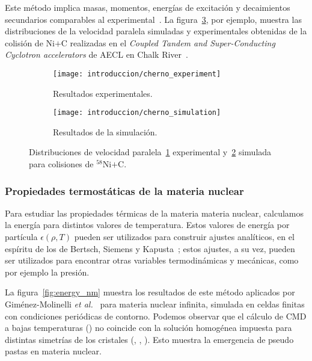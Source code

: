 Este método implica masas, momentos, energías de excitación y decaimientos secundarios comparables al experimental~\cite{belkacem_searching_1996,chernomoretz_quasiclassical_2002}.
La figura~\ref{fig:distribution}, por ejemplo, muestra las distribuciones de la velocidad paralela simuladas y experimentales obtenidas de la colisión de $\text{Ni+C}$ realizadas en el \emph{Coupled Tandem and Super-Conducting Cyclotron accelerators} de AECL en Chalk River~\cite{chernomoretz_quasiclassical_2002}.

\begin{figure}[h]
  \begin{subfigure}[h!]{0.48\columnwidth}
    \texttt{[image: introduccion/cherno\_experiment]}
    \caption{Resultados experimentales.}
    \label{sfig:exp}
  \end{subfigure}
  \begin{subfigure}[h!]{0.48\columnwidth}
    \texttt{[image: introduccion/cherno\_simulation]}
    \caption{Resultados de la simulación.}
    \label{sfig:sim}
  \end{subfigure}
  \centering
  \caption{Distribuciones de velocidad paralela~\ref{sfig:exp} experimental y~\ref{sfig:sim} simulada para colisiones de ${}^{58}\text{Ni+C}$.}
  \label{fig:distribution}
\end{figure}


\subsubsection{Propiedades termostáticas de la materia nuclear}
Para estudiar las propiedades térmicas de la materia materia nuclear, calculamos la energía para distintos valores de temperatura.
Estos valores de energía por partícula $\epsilon(\rho,T)$ pueden ser utilizados para construir ajustes analíticos, en el espíritu de los de Bertsch, Siemens y Kapusta~\cite{bertsch_nuclear_1983, kapusta_deuteron_1984,
  lopez_nuclear_1984}; estos ajustes, a su vez, pueden ser utilizados para encontrar otras variables termodinámicas y mecánicas, como por ejemplo la presión.

La figura~\ref{fig:energy_nm} muestra los resultados de este método aplicados por Giménez-Molinelli \emph{et al.}~\cite{gimenez_molinelli_simulations_2014} para materia nuclear infinita, simulada en celdas finitas con condiciones periódicas de contorno.
Podemos observar que el cálculo de CMD a bajas temperaturas () no coincide con la solución homogénea impuesta para distintas simetrías de los cristales (, , ).
Esto muestra la emergencia de pseudo pastas en materia nuclear.

